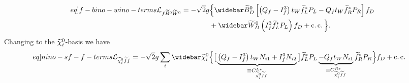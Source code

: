 \documentclass[english, notitlepage]{article}
\begin{document}
            \begin{align}
                \label[eq]{f-bino-wino-terms}
                \nonumber
                \L_{f\bino\wino} = -\sqrt{2} g & \Big\{ \wbar{\wtilde{B}}^0_D \bclosed{ \pclosed{Q_f - I^3_f} t_W \wtilde{f}_L^\ast P_L - Q_f t_W \wtilde{f}_R^\ast P_R } f_D \\
                                               & + \wbar{\wtilde{W}}^0_D \pclosed{I^3_f \wtilde{f}_L^\ast P_L} f_D + \cc \Big\}.
            \end{align}
            Changing to the $\nino[i]$-basis we have
            \begin{align}
                \label[eq]{nino-sf-f-terms}
                \L_{\nino[i]\wtilde{f}f} = -\sqrt{2} g   \sum_{i} \wbar{\wtilde{\chi}}^0_i & \Big\{ \big[ \underbrace{\pclosed{Q_f - I^3_f}t_W N_{i1}  + I^3_f N_{i2}}_{\equiv C_{\nino[i] \wtilde{f} f}^{L*}} \big] \wtilde{f}_L^\ast P_L \underbrace{- Q_f t_W N_{i1}}_{\equiv C_{\nino[i] \wtilde{f} f}^{R*}} \wtilde{f}_R^\ast P_R \Big\} f_D + \cc
            \end{align}
\end{document}
